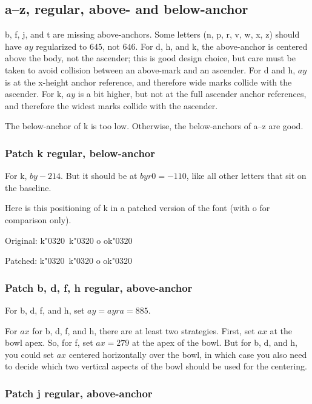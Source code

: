 \documentclass[landscape]{article}
\begin{document}
\subsection*{a--z, regular, above- and below-anchor}

b, f, j, and t are missing above-anchors.
Some letters (n, p, r, v, w, x, z) should have $ay$ regularized to $645$, not $646$.
For d, h, and k, the above-anchor is centered above the body, not the ascender; 
this is good design choice, but care must be taken to avoid collision between an above-mark and an ascender.
For d and h, $ay$ is at the x-height anchor reference, and therefore wide marks collide with the ascender.
For k, $ay$ is a bit higher, but not at the full ascender anchor references, 
and therefore the widest marks collide with the ascender.

The below-anchor of k is too low. 
Otherwise, the below-anchors of a--z are good.

\subsubsection*{Patch k regular, below-anchor}

For k, $by -214$. 
But it should be at $byr0 = -110$, like all other letters that sit on the baseline.

Here is this positioning of k in a patched version of the font (with o for comparison only).

Original: k\char"0320\ k\char"0320 o ok\char"0320

Patched: {\LibertinusSerifPatch k\char"0320\ k\char"0320 o ok\char"0320}

\subsubsection*{Patch b, d, f, h regular, above-anchor}

For b, d, f, and h, set $ay = ayra = 885$.

For $ax$ for b, d, f, and h, there are at least two strategies.
First, set $ax$ at the bowl apex.
So, for f, set $ax = 279$ at the apex of the bowl.
But for b, d, and h, you could set $ax$ centered horizontally over the bowl, 
in which case you also need to decide which two vertical aspects 
of the bowl should be used for the centering.

\subsubsection*{Patch j regular, above-anchor}
\end{document}
